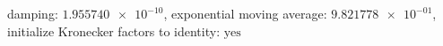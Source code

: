 damping: $\num[scientific-notation=true]{1.955740e-10}$, exponential moving average: $\num[scientific-notation=true]{9.821778e-01}$, initialize Kronecker factors to identity: $\text{yes}$